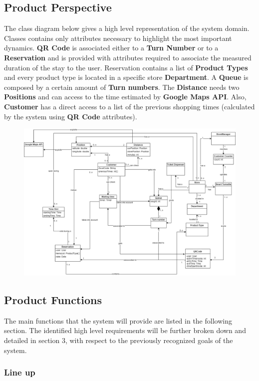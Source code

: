 \documentclass{article}
\begin{document}
\subsection{Product Perspective}
The class diagram below gives a high level representation of the system domain. Classes contains only attributes necessary to highlight the most important dynamics. \textbf{QR Code} is associated either to a \textbf{Turn Number} or to a \textbf{Reservation} and is provided with attributes required to associate the measured duration of the stay to the user. Reservation contains a list of \textbf{Product Types} and every product type is located in a specific store \textbf{Department}. A \textbf{Queue} is composed by a certain amount of \textbf{Turn numbers}. The \textbf{Distance} needs two \textbf{Positions} and can access to the time estimated by \textbf{Google Maps API}. Also, \textbf{Customer} has a direct access to a list of the previous shopping times (calculated by the system using \textbf{QR Code} attributes).
\begin{figure}[]
  \includegraphics[width=\linewidth]{class_diagram.png}
  
\end{figure}

\subsection{Product Functions}
The main functions that the system will provide are listed in the following section. The identified high level requirements will be further broken down and detailed in section 3, with respect to the previously recognized goals of the system.
\subsubsection{Line up} 
\end{document}
